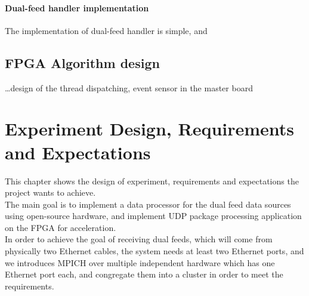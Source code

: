 \documentclass[11pt,openright,a4paper]{report}
\begin{document}
\subsubsection{Dual-feed handler implementation}
The implementation of dual-feed handler is simple, and 
\section{FPGA Algorithm design}
\dots design of the thread dispatching, event sensor in the master board

\chapter{Experiment Design, Requirements and Expectations}
This chapter shows the design of experiment, requirements and expectations the project wants to achieve. \\
The main goal is to implement a data processor for the dual feed data sources using open-source hardware, and implement UDP package processing application on the FPGA for acceleration.\\
In order to achieve the goal of receiving dual feeds, which will come from physically two Ethernet cables, the system needs at least two Ethernet ports, and we introduces MPICH over multiple independent hardware which has one Ethernet port each, and congregate them into a cluster in order to meet the requirements.\\
\newpage
\end{document}
